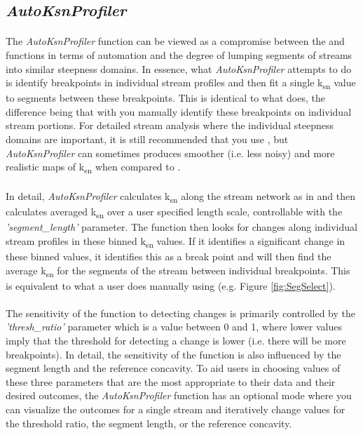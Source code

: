 \subsection{\textit{AutoKsnProfiler}} \label{sec:KsnAuto}
\paragraph{}The \textit{AutoKsnProfiler} function can be viewed as a compromise between the  and  functions in terms of automation and the degree of lumping segments of streams into similar steepness domains. In essence, what \textit{AutoKsnProfiler} attempts to do is identify breakpoints in individual stream profiles and then fit a single k\textsubscript{sn} value to segments between these breakpoints. This is identical to what  does, the difference being that with  you manually identify these breakpoints on individual stream portions. For detailed stream analysis where the individual steepness domains are important, it is still recommended that you use , but \textit{AutoKsnProfiler} can sometimes produces smoother (i.e. less noisy) and more realistic maps of k\textsubscript{sn} when compared to .

\paragraph{}In detail, \textit{AutoKsnProfiler} calculates k\textsubscript{sn} along the stream network as in  and then calculates averaged k\textsubscript{sn} over a user specified length scale, controllable with the \textit{'segment\_length'} parameter. The function then looks for changes along individual stream profiles in these binned k\textsubscript{sn} values. If it identifies a significant change in these binned values, it identifies this as a break point and will then find the average k\textsubscript{sn} for the segments of the stream between individual breakpoints. This is equivalent to what a user does manually using  (e.g. Figure \ref{fig:SegSelect}). 

\paragraph{}The sensitivity of the function to detecting changes is primarily controlled by the \textit{'thresh\_ratio'} parameter which is a value between 0 and 1, where lower values imply that the threshold for detecting a change is lower (i.e. there will be more breakpoints). In detail, the sensitivity of the function is also influenced by the segment length and the reference concavity. To aid users in choosing values of these three parameters that are the most appropriate to their data and their desired outcomes, the \textit{AutoKsnProfiler} function has an optional mode where you can visualize the outcomes for a single stream and iteratively change values for the threshold ratio, the segment length, or the reference concavity. 

